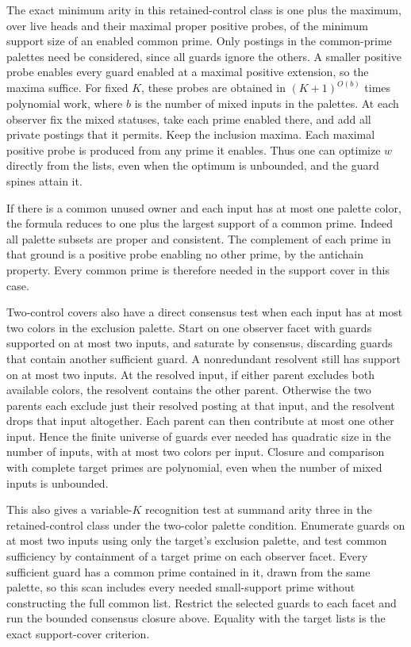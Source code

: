 The exact minimum arity in this retained-control class is
one plus the maximum, over live heads and their maximal
proper positive probes, of the minimum support size of an
enabled common prime. Only postings in the common-prime
palettes need be considered, since all guards ignore the
others. A smaller positive probe enables every guard enabled
at a maximal positive extension, so the maxima suffice.
For fixed $K$, these probes are obtained in $(K+1)^{O(b)}$
times polynomial work, where $b$ is the number of mixed
inputs in the palettes. At each observer fix the mixed
statuses, take each prime enabled there, and add all private
postings that it permits. Keep the inclusion maxima. Each
maximal positive probe is produced from any prime it enables.
Thus one can optimize $w$ directly from the lists, even
when the optimum is unbounded, and the guard spines attain it.

If there is a common unused owner and each input has at most
one palette color, the formula reduces to one plus the largest
support of a common prime. Indeed all palette subsets are
proper and consistent. The complement of each prime in that
ground is a positive probe enabling no other prime, by the
antichain property. Every common prime is therefore needed
in the support cover in this case.

Two-control covers also have a direct consensus test when
each input has at most two colors in the exclusion palette.
Start on one observer facet with guards supported on at most
two inputs, and saturate by consensus, discarding guards that
contain another sufficient guard. A nonredundant resolvent
still has support on at most two inputs. At the resolved
input, if either parent excludes both available colors, the
resolvent contains the other parent. Otherwise the two parents
each exclude just their resolved posting at that input, and
the resolvent drops that input altogether. Each parent can
then contribute at most one other input. Hence the finite
universe of guards ever needed has quadratic size in the
number of inputs, with at most two colors per input. Closure
and comparison with complete target primes are polynomial,
even when the number of mixed inputs is unbounded.

This also gives a variable-$K$ recognition test at summand
arity three in the retained-control class under the two-color
palette condition. Enumerate guards on at most two inputs
using only the target's exclusion palette, and test common
sufficiency by containment of a target prime on each observer
facet. Every sufficient guard has a common prime contained in
it, drawn from the same palette, so this scan includes every
needed small-support prime without constructing the full
common list. Restrict the selected guards to each facet and
run the bounded consensus closure above. Equality with the
target lists is the exact support-cover criterion.


